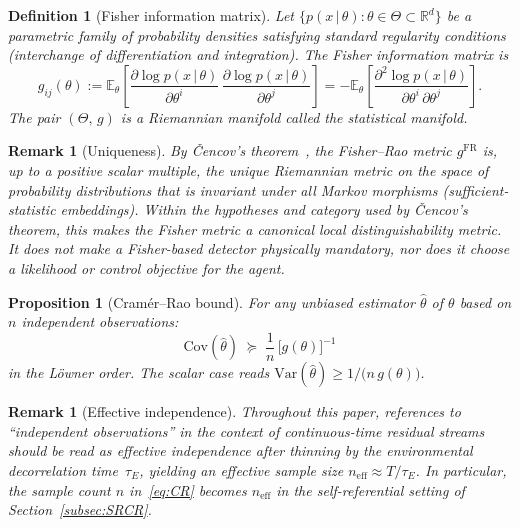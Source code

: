 \documentclass[12pt]{article}
\newtheorem{proposition}[theorem]{Proposition}
\newtheorem{definition}[theorem]{Definition}
\newtheorem{remark}[theorem]{Remark}
\begin{document}
\begin{definition}[Fisher information matrix]
\label{def:fisher}
Let $\{p(x\,|\,\theta) : \theta \in \Theta
\subset \mathbb{R}^d\}$ be a parametric family of
probability densities satisfying standard regularity
conditions (interchange of differentiation and integration).
The \emph{Fisher information matrix} is
\begin{equation}
\label{eq:fisher_def}
g_{ij}(\theta)
:= \mathbb{E}_\theta\!\left[
  \frac{\partial \log p(x\,|\,\theta)}
       {\partial \theta^i}\,
  \frac{\partial \log p(x\,|\,\theta)}
       {\partial \theta^j}
\right]
= -\mathbb{E}_\theta\!\left[
  \frac{\partial^2 \log p(x\,|\,\theta)}
       {\partial \theta^i\,\partial \theta^j}
\right].
\end{equation}
The pair $(\Theta,\,g)$ is a Riemannian manifold called the
\emph{statistical manifold}.
\end{definition}

\begin{remark}[Uniqueness]
\label{rem:cencov}
By \v{C}encov's theorem~\cite{Cencov1982}, the Fisher--Rao
metric $g^{\mathrm{FR}}$ is, up to a positive scalar
multiple, the unique Riemannian metric on the space of
probability distributions that is invariant under all
Markov morphisms (sufficient-statistic embeddings).
Within the hypotheses and category used by \v{C}encov's theorem, this
makes the Fisher metric a canonical local distinguishability metric.
It does not make a Fisher-based detector physically mandatory, nor does
it choose a likelihood or control objective for the agent.
\end{remark}

\begin{proposition}[Cram\'{e}r--Rao bound]
\label{prop:CR}
For any unbiased estimator $\hat{\theta}$ of $\theta$ based
on $n$ independent observations:
\begin{equation}
\label{eq:CR}
\mathrm{Cov}(\hat{\theta})
\;\succeq\; \frac{1}{n}\,\bigl[g(\theta)\bigr]^{-1}
\end{equation}
in the L\"{o}wner order.
The scalar case reads
$\mathrm{Var}(\hat{\theta})
\geq 1/\bigl(n\,g(\theta)\bigr)$.
\end{proposition}

\begin{remark}[Effective independence]
\label{rem:effective_independence}
Throughout this paper, references to ``independent
observations'' in the context of continuous-time residual
streams should be read as \emph{effective independence}
after thinning by the environmental decorrelation
time~$\tau_E$, yielding an effective sample size
$n_{\mathrm{eff}} \approx T/\tau_E$.
In particular, the sample count $n$ in~\eqref{eq:CR}
becomes $n_{\mathrm{eff}}$ in the self-referential
setting of Section~\ref{subsec:SRCR}.
\end{remark}
\end{document}
